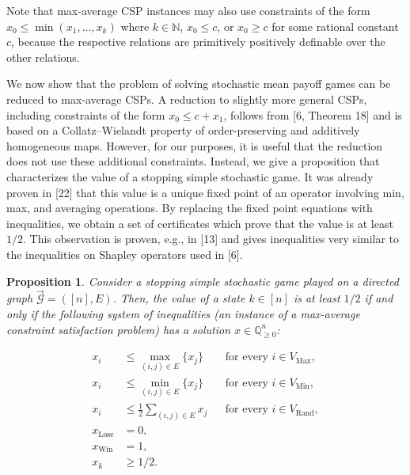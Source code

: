 \documentclass[10pt,a4paper]{article}
\newtheorem{proposition}[theorem]{Proposition}
\theoremstyle{definition}
\begin{document}
Note that max-average CSP instances may also use constraints of the form $x_{0}\leq\min(x_{1},\dots,x_{k})$ where $k\in\mathbb{N}$, $x_{0}\leq c$, or $x_{0}\geq c$ for some rational constant $c$, because the respective relations are primitively positively definable over the other relations.

We now show that the problem of solving stochastic mean payoff games can be reduced to max-average CSPs. A reduction to slightly more general CSPs, including constraints of the form $x_{0}\leq c+x_{1}$, follows from [6, Theorem 18] and is based on a Collatz–Wielandt property of order-preserving and additively homogeneous maps. However, for our purposes, it is useful that the reduction does not use these additional constraints. Instead, we give a proposition that characterizes the value of a stopping simple stochastic game. It was already proven in [22] that this value is a unique fixed point of an operator involving min, max, and averaging operations. By replacing the fixed point equations with inequalities, we obtain a set of certificates which prove that the value is at least $1/2$. This observation is proven, e.g., in [13] and gives inequalities very similar to the inequalities on Shapley operators used in [6].

\setcounter{theorem}{4}
\begin{proposition}\label{Thmtheorem5}
Consider a stopping simple stochastic game played on a directed graph $\vec{\mathcal{G}}=([n],E)$. Then, the value of a state $k\in[n]$ is at least $1/2$ if and only if the following system of inequalities (an instance of a max-average constraint satisfaction problem) has a solution $x\in\mathbb{Q}_{\geq 0}^{n}$:


\begin{equation}\tag{1}\label{S3.E1}
\begin{aligned}
\displaystyle x_{i} & \displaystyle\leq\max_{(i,j)\in E}\{x_{j}\} &  & \displaystyle\text{for every }i\in V_{\mathrm{Max}}, \\
\displaystyle x_{i} & \displaystyle\leq\min_{(i,j)\in E}\{x_{j}\} &  & \displaystyle\text{for every }i\in V_{\mathrm{Min}}, \\
\displaystyle x_{i} & \displaystyle\leq\frac{1}{2}\sum_{(i,j)\in E}x_{j} &  & \displaystyle\text{for every }i\in V_{\mathrm{Rand}}, \\
\displaystyle x_{\mathrm{Lose}} & \displaystyle=0, \\
\displaystyle x_{\mathrm{Win}} & \displaystyle=1, \\
\displaystyle x_{k} & \displaystyle\geq 1/2.
\end{aligned}
\end{equation}
\end{proposition}
\end{document}
